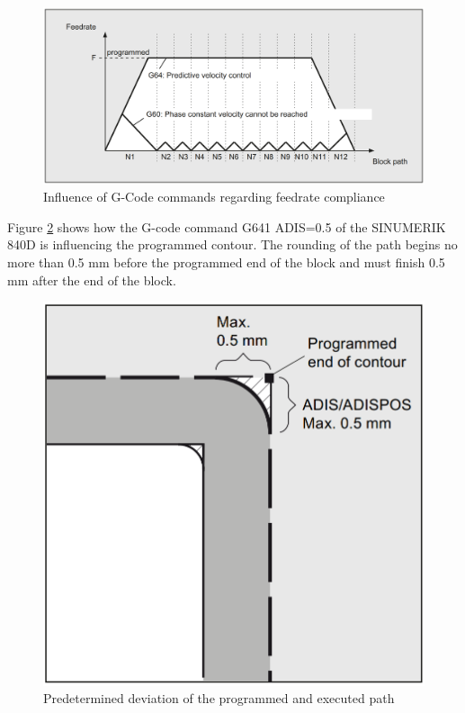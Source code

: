  \begin{figure}[H]
 	\centerline{\includegraphics[scale=0.25]{figures/conti1.png}}
 	\caption{Influence of G-Code commands regarding feedrate compliance \cite{sinumericmanual}}
 	\label{C2}
 \end{figure}
 
Figure \ref{C3} shows how the G-code command G641 ADIS=0.5 of the SINUMERIK 840D is influencing the programmed contour. The rounding of the path begins no more than 0.5 mm before the programmed end of the block and must finish 0.5 mm after the end of the block. 
 
 \begin{figure}[H]
 	\centerline{\includegraphics[scale=.25]{figures/conti2.png}}
 	\caption{Predetermined deviation of the programmed and executed path \cite{sinumericmanual}}
 	\label{C3}
 \end{figure}

